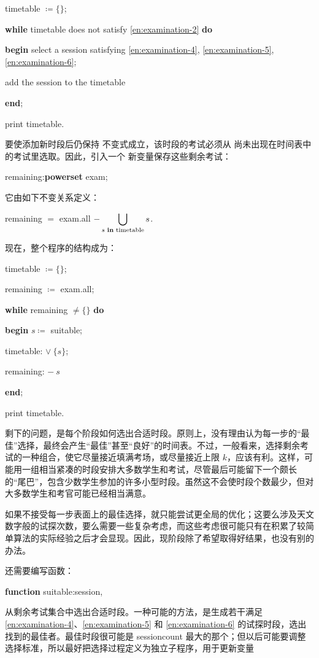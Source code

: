 \documentclass[twoside,11pt,fontset=none]{ctexbook}
\begin{document}
\quad timetable $\coloneq \{\}$;

\quad \textbf{while} timetable does not satisfy \ref{en:examination-2} \textbf{do}

\quad \textbf{begin} select a session satisfying \ref{en:examination-4}, \ref{en:examination-5}, \ref{en:examination-6};

\quad \quad add the session to the timetable

\quad \textbf{end};

\quad print timetable.

要使添加新时段后仍保持
不变式成立，该时段的考试必须从
尚未出现在时间表中的考试里选取。因此，引入一个
新变量保存这些剩余考试：

\quad remaining:\textbf{powerset} exam;

\noindent
它由如下不变关系定义：

\quad remaining $=$ exam.all $- \displaystyle\bigcup_{s \text{ \textbf{in} timetable}} s$.

\noindent
现在，整个程序的结构成为：

\quad timetable $\coloneq \{\}$;

\quad remaining $\coloneq$ exam.all;

\quad \textbf{while} remaining $\neq \{\}$ \textbf{do}

\quad \quad \textbf{begin} $s\coloneq$ suitable;

\quad \quad \quad timetable: $\vee\ \{s\}$;

\quad \quad \quad remaining: $-\ s$

\quad \quad \textbf{end};

\quad print timetable.

剩下的问题，是每个阶段如何选出合适时段。原则上，没有理由认为每一步的“最佳”选择，最终会产生“最佳”甚至“良好”的时间表。不过，一般看来，选择剩余考试的一种组合，使它尽量接近填满考场，或尽量接近上限 $k$，应该有利。这样，可能用一组相当紧凑的时段安排大多数学生和考试，尽管最后可能留下一个颇长的“尾巴”，包含少数学生参加的许多小型时段。虽然这不会使时段个数最少，但对大多数学生和考官可能已经相当满意。

如果不接受每一步表面上的最佳选择，就只能尝试更全局的优化；这要么涉及天文数字般的试探次数，要么需要一些复杂考虑，而这些考虑很可能只有在积累了较简单算法的实际经验之后才会显现。因此，现阶段除了希望取得好结果，也没有别的办法。

还需要编写函数：

\quad \textbf{function} suitable:session,

\noindent
从剩余考试集合中选出合适时段。一种可能的方法，是生成若干满足 \ref{en:examination-4}、\ref{en:examination-5} 和 \ref{en:examination-6} 的试探时段，选出找到的最佳者。最佳时段很可能是 sessioncount 最大的那个；但以后可能要调整选择标准，所以最好把选择过程定义为独立子程序，用于更新变量
\end{document}
